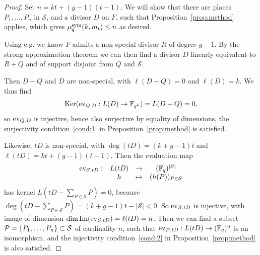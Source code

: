 \begin{proof}
Set $n=kt+(g-1)(t-1)$. We will show that there are places $P_1,\dots,P_n$ in $\mathcal{S}$,
and a divisor $D$ on $F$, such that Proposition~\ref{prop:method} applies,
which gives $\mu^{\textrm{sym}}_q(k,m_t)\leq n$ as desired.

Using e.g. \cite[Lemma~2.1]{Ballet99} we know $F$ admits a non-special divisor $R$ of degree $g-1$.
By the strong approximation theorem \cite[Thm.~1.6.5]{Stichtenoth09}
we can then find a divisor $D$ linearly equivalent to $R+Q$ and of support disjoint from $Q$ and $\mathcal{S}$.

Then $D-Q$ and $D$ are non-special, with $\ell(D-Q)=0$ and $\ell(D)=k$.
We thus find
\[
  \operatorname{Ker}(\operatorname{ev}_{Q, D}:L(D)\to\mathbb{F}_{q^k}) = L(D-Q) = 0,
\]
so $\operatorname{ev}_{Q, D}$ is injective, hence also surjective by equality of dimensions,
\ie the surjectivity condition~\ref{cond:1} in Proposition~\ref{prop:method} is satisfied.

Likewise, $tD$ is non-special, with $\deg(tD)=(k+g-1)t$ and $\ell(tD)=kt+(g-1)(t-1)$.
Then the evaluation map
\[
\begin{array}{cccc}
\operatorname{ev}_{\mathcal{S}, tD}: & L(tD) & \to & (\mathbb{F}_{q})^{|\mathcal{S}|}\\
  & h & \mapsto & (h(P))_{P\in\mathcal{S}}
\end{array}
\]
has kernel $L(tD-\sum_{P\in\mathcal{S}}P)=0$, because $\deg(tD-\sum_{P\in\mathcal{S}}P)=(k+g-1)t-|\mathcal{S}|<0$.
So $\operatorname{ev}_{\mathcal{S}, tD}$ is injective, with image of dimension $\dim\operatorname{Im}(\operatorname{ev}_{\mathcal{S}, tD})=\ell(tD)=n$.
Then we can find a subset $\mathcal{P}=\{P_1,\dots,P_n\}\subset\mathcal{S}$ of cardinality $n$,
such that $\operatorname{ev}_{\mathcal{P}, tD}: L(tD) \to (\mathbb{F}_{q})^n$ is an isomorphism,
and the injectivity condition~\ref{cond:2} in Proposition~\ref{prop:method} is also satisfied.
\end{proof}

